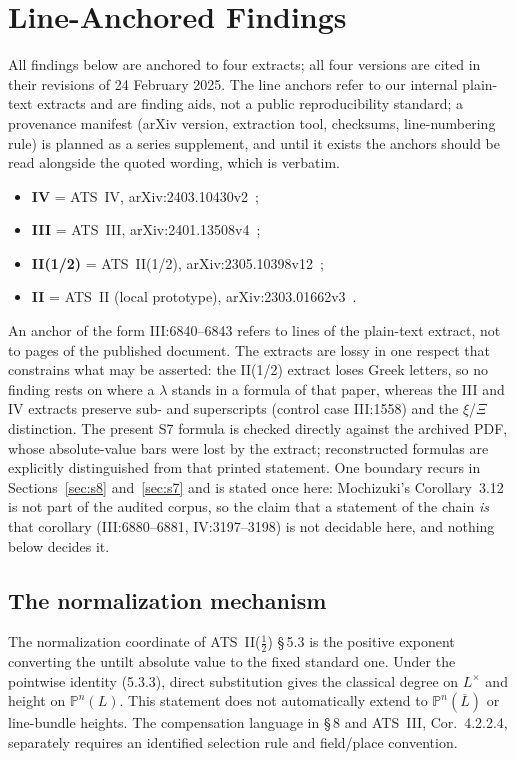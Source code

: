 \documentclass[11pt,a4paper]{article}
\theoremstyle{definition}
\theoremstyle{remark}
\begin{document}
\section{Line-Anchored Findings}\label{sec:findings}

All findings below are anchored to four extracts; all four versions are
cited in their revisions of 24 February 2025. The line anchors refer to our
internal plain-text extracts and are finding aids, not a public
reproducibility standard; a provenance manifest (arXiv version, extraction
tool, checksums, line-numbering rule) is planned as a series supplement,
and until it exists the anchors should be read alongside the quoted
wording, which is verbatim.
\begin{itemize}
\item \textbf{IV} = ATS~IV, arXiv:2403.10430v2~\cite{joshiIV};
\item \textbf{III} = ATS~III, arXiv:2401.13508v4~\cite{joshiIII};
\item \textbf{II(1/2)} = ATS~II(1/2), arXiv:2305.10398v12~\cite{joshiIIhalf};
\item \textbf{II} = ATS~II (local prototype), arXiv:2303.01662v3~\cite{joshiII}.
\end{itemize}
An anchor of the form III:6840--6843 refers to lines of the plain-text extract,
not to pages of the published document. The extracts are lossy in one respect that
constrains what may be asserted: the II(1/2) extract loses Greek letters, so no
finding rests on where a $\lambda$ stands in a formula of that paper, whereas the
III and IV extracts preserve sub- and superscripts (control case III:1558) and the
$\xi$/$\Xi$ distinction. The present S7 formula is checked directly against the archived PDF,
whose absolute-value bars were lost by the extract; reconstructed formulas
are explicitly distinguished from that printed statement. One boundary recurs in Sections~\ref{sec:s8} and~\ref{sec:s7} and
is stated once here: Mochizuki's Corollary~3.12 is not part of the audited corpus,
so the claim that a statement of the chain \emph{is} that corollary
(III:6880--6881, IV:3197--3198) is not decidable here, and nothing below decides
it.

\subsection{The normalization mechanism}\label{sec:fneu1}

The normalization coordinate of ATS~II($\tfrac12$) \S\,5.3 is the positive
exponent converting the untilt absolute value to the fixed standard one.
Under the pointwise identity (5.3.3), direct substitution gives the classical
degree on $L^\times$ and height on $\mathbb P^n(L)$. This statement does not
automatically extend to $\mathbb P^n(\overline L)$ or line-bundle heights.
The compensation language in \S\,8 and ATS~III, Cor.~4.2.2.4, separately
requires an identified selection rule and field/place convention.
\end{document}
